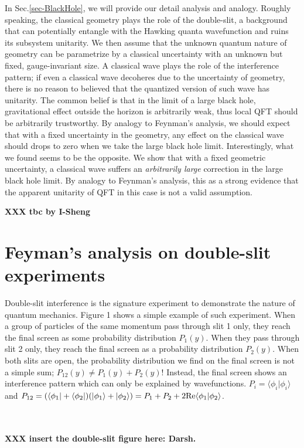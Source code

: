 \documentclass[aps,showpacs,twocolumn,floats,prd,superscriptaddress,nofootinbib]{revtex4-1}
\begin{document}
In Sec.\ref{sec-BlackHole}, we will provide our detail analysis and analogy. 
Roughly speaking, the classical geometry plays the role of the double-slit, a background that can potentially entangle with the Hawking quanta wavefunction and ruins its subsystem unitarity. 
We then assume that the unknown quantum nature of geometry can be parametrize by a classical uncertainty with an unknown but fixed, gauge-invariant size. 
A classical wave plays the role of the interference pattern; if even a classical wave decoheres due to the uncertainty of geometry, there is no reason to believed that the quantized version of such wave has unitarity.
The common belief is that in the limit of a large black hole, gravitational effect outside the horizon is arbitrarily weak, thus local QFT should be arbitrarily trustworthy.
By analogy to Feynman's analysis, we should expect that with a fixed uncertainty in the geometry, any effect on the classical wave should drops to zero when we take the large black hole limit.
Interestingly, what we found seems to be the opposite. 
We show that with a fixed geometric uncertainty, a classical wave suffers an {\it arbitrarily large} correction in the large black hole limit.
By analogy to Feynman's analysis, this as a strong evidence that the apparent unitarity of QFT in this case is not a valid assumption.

{\bf XXX tbc by I-Sheng}


\section{Feyman's analysis on double-slit experiments}
\label{sec-DoubleSlit}

Double-slit interference is the signature experiment to demonstrate the nature of quantum mechanics. Figure 1 shows a simple example of such experiment.
When a group of particles of the same momentum pass through slit 1 only, they reach the final screen as some probability distribution $P_1(y)$. 
When they pass through slit 2 only, they reach the final screen as a probability distribution $P_2(y)$.
When both slits are open, the probability distribution we find on the final screen is not a simple sum; $P_{12}(y) \neq P_1(y) + P_2(y)$! 
Instead, the final screen shows an interference pattern which can only be explained by wavefunctions.
$P_i = \langle \phi_i | \phi_i \rangle$ and $P_{12} = (\langle \phi_1|+\langle \phi_2| ) (|\phi_1\rangle + | \phi_2 \rangle)=P_1 + P_2 + 2{\rm Re}\langle\phi_1|\phi_2\rangle$.

\ \\ \ \\
{\bf XXX insert the double-slit figure here: Darsh.}
\ \\ \ \\
\end{document}

